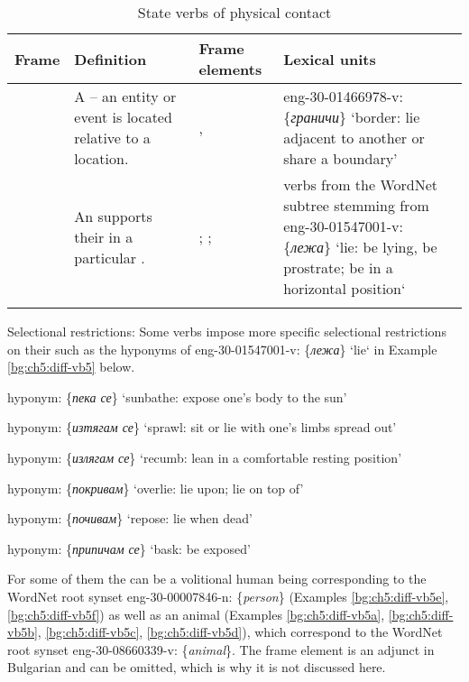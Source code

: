 \documentclass[output=paper,colorlinks,citecolor=brown]{langscibook}
\begin{document}
\begin{table}
\small
\begin{tabularx}{\textwidth}{lQQQ}
\lsptoprule
Frame & Definition & Frame elements & Lexical units \\
\midrule
{} & A  -- an entity or event is located relative to a  location. & ,  & eng-30-01466978-v: \{\textit{граничи}\} ‘border: lie adjacent to another or share a boundary’\\
\midrule
{} & An  supports their  in a particular . & ; ;  & verbs from the WordNet subtree stemming from eng-30-01547001-v: \{\textit{лежа}\} `lie: be lying, be prostrate; be in a horizontal position` \\
\lspbottomrule
\end{tabularx}
\caption{State verbs of physical contact}
\label{tab:chapter5handle:keytotable3}
\end{table}

Selectional restrictions: Some verbs impose more specific selectional restrictions on their  such as the hyponyms of eng-30-01547001-v: \{\textit{лежа}\} `lie` in Example \ref{bg:ch5:diff-vb5} below. 

\begin{exe} 
\ex \label{bg:ch5:diff-vb5}
\begin{xlist}
\ex \label{bg:ch5:diff-vb5a} hyponym: \{\textit{пека се}\} ‘sunbathe: expose one's body to the sun’

\ex\label{bg:ch5:diff-vb5b} hyponym: \{\textit{изтягам се}\} ‘sprawl: sit or lie with one's limbs spread out’

\ex\label{bg:ch5:diff-vb5c} hyponym: \{\textit{излягам се}\} ‘recumb: lean in a comfortable resting position’

\ex\label{bg:ch5:diff-vb5d} hyponym: \{\textit{покривам}\} ‘overlie: lie upon; lie on top of’

\ex\label{bg:ch5:diff-vb5e} hyponym: \{\textit{почивам}\} ‘repose: lie when dead’

\ex\label{bg:ch5:diff-vb5f} hyponym: \{\textit{припичам се}\} ‘bask: be exposed’
\end{xlist}
\end{exe} 

For some of them the  can be a volitional human being corresponding to the WordNet root synset eng-30-00007846-n: \{\textit{person}\} (Examples \ref{bg:ch5:diff-vb5e}, \ref{bg:ch5:diff-vb5f}) as well as an animal (Examples \ref{bg:ch5:diff-vb5a}, \ref{bg:ch5:diff-vb5b}, \ref{bg:ch5:diff-vb5c}, \ref{bg:ch5:diff-vb5d}), which correspond to the WordNet root synset eng-30-08660339-v: \{\textit{animal}\}. The frame element  is an adjunct in Bulgarian and can be omitted, which is why it is not discussed here.
\end{document}
